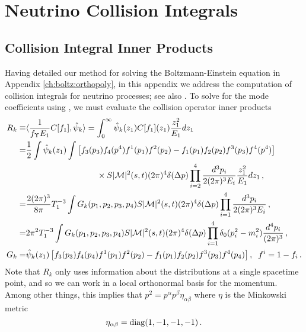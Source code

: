 
\section{Neutrino Collision Integrals}\label{ch:coll:simp}


\subsection{Collision Integral Inner Products}
Having detailed our method for solving the Boltzmann-Einstein equation in Appendix \ref{ch:boltz:orthopoly}, in this appendix we address the computation of  collision integrals for neutrino processes; see also \cite{Birrell:2014uka}. To solve for the mode coefficients using , we must evaluate the collision operator inner products
\begin{align}\label{collision:integrals}
R_k\equiv&\langle\frac{1}{f_\Upsilon E_1}C[f_1],\hat\psi_k\rangle=\int_0^\infty \hat\psi_k(z_1)C[f_1](z_1) \frac{z_1^2}{E_1}dz_1\\
=&\frac{1}{2}\int \hat\psi_k(z_1)\int\left[f_3(p_3)f_4(p^4)f^1(p_1)f^2(p_2)-f_1(p_1)f_2(p_2)f^3(p_3)f^4(p^4)\right]\notag\\
&\hspace{30mm}\times S |\mathcal{M}|^2(s,t)(2\pi)^4\delta(\Delta p)\prod_{i=2}^4\frac{d^{3}p_i}{2(2\pi)^3E_i}\frac{z_1^2}{E_1}dz_1\,,\notag\\
=&\frac{2(2\pi)^3}{8\pi}T_1^{-3}\int G_k(p_1,p_2,p_3,p_4)S |\mathcal{M}|^2(s,t)(2\pi)^4\delta(\Delta p)\prod_{i=1}^4\frac{d^{3}p_i}{2(2\pi)^3E_i}\,,\notag\\
=&2\pi^2T_1^{-3}\int G_k(p_1,p_2,p_3,p_4)S |\mathcal{M}|^2(s,t)(2\pi)^4\delta(\Delta p)\prod_{i=1}^4 \delta_0(p_i^2-m_i^2)\frac{d^4p_i}{(2\pi)^3}\,,\notag\\
G_k=&\hat\psi_k(z_1)\left[f_3(p_3)f_4(p_4)f^1(p_1)f^2(p_2)-f_1(p_1)f_2(p_2)f^3(p_3)f^4(p_4)\right],\hspace{2mm} f^i=1- f_i\,.\notag
\end{align}
Note that $R_k$ only uses information about the distributions at a single spacetime point, and so we can work in a local orthonormal basis for the momentum.  Among other things, this implies that $p^2=p^\alpha p^\beta\eta_{\alpha\beta}$ where $\eta$ is the Minkowski metric
\begin{equation}
\eta_{\alpha\beta}=\mathrm{diag}(1,-1,-1,-1)\,.
\end{equation}

